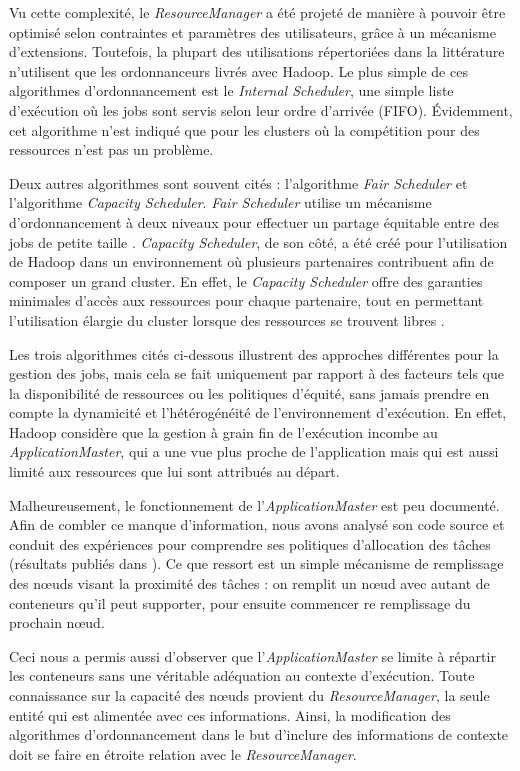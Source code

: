 Vu cette complexité, le \textit{ResourceManager} a été projeté de manière à pouvoir être optimisé selon contraintes et paramètres des utilisateurs, grâce à un mécanisme d'extensions. Toutefois, la plupart des utilisations répertoriées dans la littérature n'utilisent que les ordonnanceurs livrés avec Hadoop. Le plus simple de ces algorithmes d'ordonnancement est le \textit{Internal Scheduler}, une simple liste d'exécution où les jobs sont servis selon leur ordre d'arrivée (FIFO). Évidemment, cet algorithme n'est indiqué que pour les clusters où la compétition pour des ressources n'est pas un problème. 

Deux autres algorithmes sont souvent cités : l'algorithme \textit{Fair Scheduler} et l'algorithme \textit{Capacity Scheduler}. \textit{Fair Scheduler} utilise un mécanisme d'ordonnancement à deux niveaux pour effectuer un partage équitable entre des jobs de petite taille \cite{Hadoop}. \textit{Capacity Scheduler}, de son côté, a été créé pour l'utilisation de Hadoop dans un environnement où plusieurs partenaires contribuent afin de composer un grand cluster. En effet, le \textit{Capacity Scheduler} offre des garanties minimales d'accès aux ressources pour chaque partenaire, tout en permettant l'utilisation élargie du cluster lorsque des ressources se trouvent libres \cite{Hadoop}.

Les trois algorithmes cités ci-dessous illustrent des approches différentes pour la gestion des jobs, mais cela se fait uniquement par rapport à des facteurs tels que la disponibilité de ressources ou les politiques d'équité, sans jamais prendre en compte la dynamicité et l'hétérogénéité de l'environnement d'exécution. En effet, Hadoop considère que la gestion à grain fin de l'exécution incombe au  \textit{ApplicationMaster}, qui a une vue plus proche de l'application mais qui est aussi limité aux ressources que lui sont attribués au départ.

Malheureusement, le fonctionnement de l'\textit{ApplicationMaster} est peu documenté. Afin de combler ce manque d'information, nous avons analysé son code source et conduit des expériences pour comprendre ses politiques d'allocation des tâches (résultats publiés dans \cite{UBICOMM2014}). Ce que ressort est un simple mécanisme de remplissage des n{\oe}uds visant la proximité des tâches : on remplit un n{\oe}ud avec autant de conteneurs qu'il peut supporter, pour ensuite commencer re remplissage du prochain n{\oe}ud.   

Ceci nous a permis aussi d'observer que l'\textit{ApplicationMaster} se limite à répartir les conteneurs sans une véritable adéquation au contexte d'exécution. Toute connaissance sur la capacité des n{\oe}uds provient du \textit{ResourceManager}, la seule entité qui est alimentée avec ces informations. Ainsi, la modification des algorithmes d'ordonnancement dans le but d'inclure des informations de contexte doit se faire en étroite relation avec le \textit{ResourceManager}.



